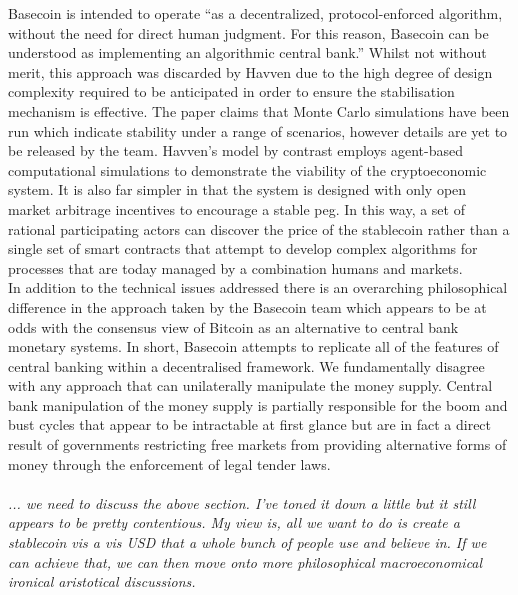 \noindent Basecoin is intended to operate ``as a decentralized, protocol-enforced algorithm, without the need for direct human judgment. For this reason, Basecoin can be understood as implementing an algorithmic central bank.'' Whilst not without merit, this approach was discarded by Havven due to the high degree of design complexity required to be anticipated in order to ensure the stabilisation mechanism is effective. The paper claims that Monte Carlo simulations have been run which indicate stability under a range of scenarios, however details are yet to be released by the team. Havven's model by contrast employs agent-based computational simulations to demonstrate the viability of the cryptoeconomic system. It is also far simpler in that the system is designed with only open market arbitrage incentives to encourage a stable peg. In this way, a set of rational participating actors can discover the price of the stablecoin rather than a single set of smart contracts that attempt to develop complex algorithms for processes that are today managed by a combination humans and markets. \\

\noindent In addition to the technical issues addressed there is an overarching philosophical difference in the approach taken by the Basecoin team which appears to be at odds with the consensus view of Bitcoin as an alternative to central bank monetary systems. In short, Basecoin attempts to replicate all of the features of central banking within a decentralised framework. We fundamentally disagree with any approach that can unilaterally manipulate the money supply. Central bank manipulation of the money supply is partially responsible for the boom and bust cycles that appear to be intractable at first glance but are in fact a direct result of governments restricting free markets from providing alternative forms of money through the enforcement of legal tender laws. \\ \\

\textit{... we need to discuss the above section. I've toned it down a little but it still appears to be pretty contentious. My view is, all we want to do is create a stablecoin vis a vis USD that a whole bunch of people use and believe in. If we can achieve that, we can then move onto more philosophical macroeconomical ironical aristotical discussions. }\\

